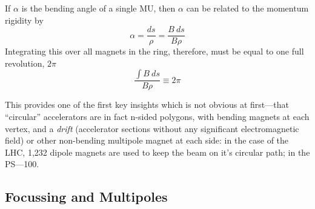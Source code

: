 \documentclass[11pt]{report}
\begin{document}
If $\alpha$ is the bending angle of a single MU, then $\alpha$ can be related to the momentum rigidity by
\begin{equation}
\alpha=\frac{ds}\rho=\frac{B\ ds}{B\rho}
\end{equation}
Integrating this over all magnets in the ring, therefore, must be equal to one full revolution, $2\pi$
\begin{equation}
\frac{\int B\ ds}{B\rho}\equiv2\pi
\end{equation}

This provides one of the first key insights which is not obvious at first---that ``circular'' accelerators are in fact n-sided polygons, with bending magnets at each vertex, and a \textit{drift} (accelerator sections without any significant electromagnetic field) or other non-bending multipole magnet at each side: in the case of the LHC, 1,232 dipole magnets are used to keep the beam on it's circular path; in the PS---100.

\subsection{Focussing and Multipoles}
\end{document}
